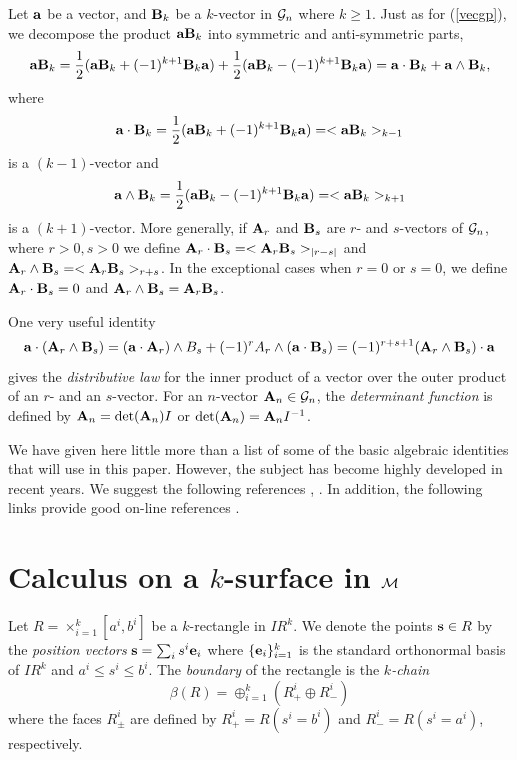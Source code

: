 \documentclass[12]{article}
\def\bs{{\bf s}}
\def\bA{{\bf A}}
\def\bB{{\bf B}}
\def\ba{{\bf a}}
\def\be{{\bf e}}
\def\R{I\!\!R}
\def\beq{\begin{equation}}
\def\eeq{\end{equation}}
\def\w{\wedge}
\def\bB{{\bf B}}
\def\G{I\!\!\!G}
\def \G {{\cal G}}
\begin{document}
   Let $\ba$ be a vector, and $\bB_k$ be a $k$-vector in $\G_n$ where $k \ge 1$. Just as for (\ref{vecgp}),
we decompose the product $\ba \bB_k$ into symmetric and anti-symmetric parts,
   \beq  \ba \bB_k =  \frac{1}{2}(\ba \bB_k + (-1)^{k+1}\bB_k \ba) +
    \frac{1}{2}(\ba \bB_k - (-1)^{k+1} \bB_k \ba)=\ba \cdot \bB_k + \ba \w \bB_k ,
                       \label{kvecgp} \eeq 
where 
  \[\ba \cdot \bB_k = \frac{1}{2}(\ba \bB_k + (-1)^{k+1}\bB_k \ba)=<\ba \bB_k>_{k-1}\]
   is a $(k-1)$-vector and
 \[ \ba \w \bB_k =  \frac{1}{2}(\ba \bB_k - (-1)^{k+1} \bB_k \ba)=<\ba \bB_k>_{k+1}\]
  is a $(k+1)$-vector. More generally, if $\bA_r$ and $\bB_s$ are $r$- and $s$-vectors of $\G_n$, 
  where $r>0, s>0$
  we define $\bA_r \cdot \bB_s=<\bA_r \bB_s>_{|r-s|}$ and $\bA_r \w \bB_s=<\bA_r \bB_s>_{r+s}$. 
  In the exceptional cases when $r=0$ or $s=0$, we define $\bA_r\cdot \bB_s=0$ and 
  $\bA_r\w \bB_s =\bA_r \bB_s$.
  
  One very useful identity
     \[ \ba\cdot (\bA_r\w \bB_s)=(\ba \cdot \bA_r)\w B_s+(-1)^r A_r \w (\ba \cdot \bB_s)=
       (-1)^{r+s+1}(\bA_r\w \bB_s)\cdot \ba     \]
gives the {\it distributive law} for the inner product of a vector over the outer product of an
$r$- and an $s$-vector. For an $n$-vector $\bA_n\in \G_n$, the {\it determinant function} is
defined by $\bA_n=\det(\bA_n)I$ or $\det(\bA_n)=\bA_n I^{-1}$.  
   
      We have given here little more than a list of some of the basic algebraic 
identities that will use in this paper. However, the subject has become highly developed in recent years. 
We suggest the following references \cite{H/S}, \cite{LP97}.
In addition, the following links provide good on-line references \cite{links}.
 
  \section*{Calculus on a $k$-surface in $\cal M$}

Let $R=\times_{i=1}^k[a^i,b^i]$ be a $k$-rectangle in $\R^k$. We denote the points $\bs \in R$ by
  the {\it position vectors} $\bs =\sum_i s^i \be_i$ where $\{\be_i\}_{i=1}^k$ 
  is the standard orthonormal basis of $\R^k$
  and $a^i\le s^i \le b^i$.
The {\it boundary} of the rectangle is the {\it $k$-chain}
\begin{displaymath}
\beta(R) = \oplus_{i=1}^k (R^i_+ \oplus R^i_-)
\end{displaymath}
where the faces $R^i_\pm$ are defined by $R^i_+ =R(s^i=b^i)$ and $R^i_-=R(s^i=a^i)$, respectively. 
\end{document}
